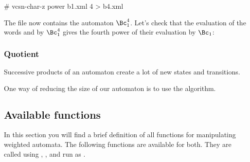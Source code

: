 \begin{shell}
# vcsn-char-z power b1.xml 4 > b4.xml
\end{shell}

\noindent
The file  now contains the automaton $\Bc_1^4$.  Let's
check that the evaluation of the words  and  by
$\Bc_1^4$ gives the fourth power of their evaluation by $\Bc_1$:


\subsubsection{Quotient}

Successive products of an automaton create a lot of new states and
transitions.


One way of reducing the size of our automaton is to use the
 algorithm.



\subsection{Available functions}

In this section you will find a brief definition of all functions for
manipulating weighted automata. The following functions are available
for both.  They are called using ,
, and  run as
.


